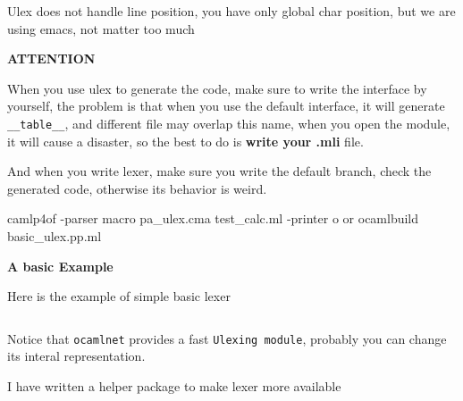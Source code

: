 Ulex does not handle line position, you have only global char
position, but we are using emacs, not matter too much

\textbf{ATTENTION}

When you use ulex to generate the code, make sure to write the
interface by yourself, the problem is that when you use the default
interface, it will generate \verb|__table__|, and different file may
overlap this name, when you open the module, it will cause a disaster,
so the best to do is \textbf{write your .mli} file.

And when you write lexer, make sure you write the default branch,
check the generated code, otherwise its behavior is weird.


\begin{bluetext}
camlp4of -parser macro pa_ulex.cma test_calc.ml -printer o
or
ocamlbuild basic_ulex.pp.ml
\end{bluetext}

\textbf{A basic Example}

Here is the example of simple basic lexer 
\inputminted[fontsize=\scriptsize, fontsize=\scriptsize, ]{ocaml}{lexing/code/ulex/basic_ulex.ml}
Notice that \verb|ocamlnet| provides a fast \verb|Ulexing module|,
probably you can change its interal representation.


I have written a helper package to make lexer more available

